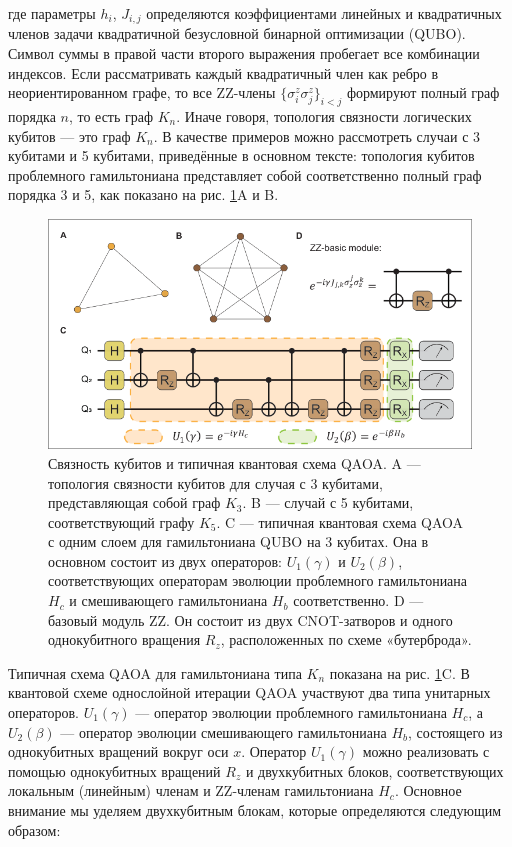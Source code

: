 где параметры $h_i$, $J_{i,j}$ определяются коэффициентами линейных и
квадратичных членов задачи квадратичной безусловной бинарной оптимизации
(QUBO). Символ суммы в правой части второго выражения пробегает все комбинации
индексов. Если рассматривать каждый квадратичный член как ребро в
неориентированном графе, то все ZZ-члены $\{\sigma_i^z \sigma_j^z\}_{i<j}$
формируют полный граф порядка $n$, то есть граф $K_n$. Иначе говоря, топология
связности логических кубитов — это граф $K_n$. В качестве примеров можно
рассмотреть случаи с 3 кубитами и 5 кубитами, приведённые в основном тексте:
топология кубитов проблемного гамильтониана представляет собой соответственно
полный граф порядка 3 и 5, как показано на рис. \ref{fig:fig11}A и B.

\begin{figure}
    \centering
    \includegraphics[scale=0.6]{inc/fig_11.png}
    \caption{
    Связность кубитов и типичная квантовая схема QAOA. A — топология связности
    кубитов для случая с 3 кубитами, представляющая собой граф $K_3$. B —
    случай с 5 кубитами, соответствующий графу $K_5$. C — типичная квантовая
    схема QAOA с одним слоем для гамильтониана QUBO на 3 кубитах. Она в
    основном состоит из двух операторов: $U_1(\gamma)$ и $U_2(\beta)$,
    соответствующих операторам эволюции проблемного гамильтониана $H_c$ и
    смешивающего гамильтониана $H_b$ соответственно. D — базовый модуль ZZ. Он
    состоит из двух CNOT-затворов и одного однокубитного вращения $R_z$,
    расположенных по схеме «бутерброда».
    }
    \label{fig:fig11}
\end{figure}

Типичная схема QAOA для гамильтониана типа $K_n$ показана на рис.
\ref{fig:fig11}C. В квантовой схеме однослойной итерации QAOA участвуют два
типа унитарных операторов. $U_1(\gamma)$ — оператор эволюции проблемного
гамильтониана $H_c$, а $U_2(\beta)$ — оператор эволюции смешивающего
гамильтониана $H_b$, состоящего из однокубитных вращений вокруг оси $x$.
Оператор $U_1(\gamma)$ можно реализовать с помощью однокубитных вращений $R_z$
и двухкубитных блоков, соответствующих локальным (линейным) членам и ZZ-членам
гамильтониана $H_c$. Основное внимание мы уделяем двухкубитным блокам, которые
определяются следующим образом:

